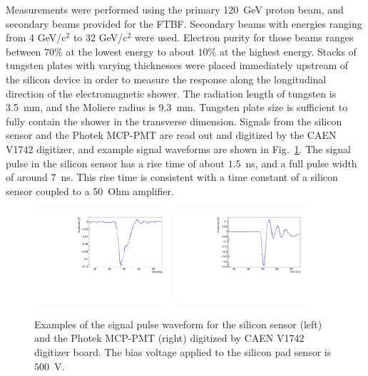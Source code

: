 \documentclass[12pt]{article}
\begin{document}
{Measurements were performed using the primary 120~GeV proton beam, and secondary
beams provided for the FTBF. Secondary beams with energies ranging from 4
GeV/c$^2$ to 32 GeV/c$^2$ were used. Electron purity for those beams ranges
between $70\%$ at the lowest energy to about $10\%$ at the highest energy.
Stacks of tungsten plates with varying thicknesses were placed immediately
upstream of the silicon device in order to measure the response along the
longitudinal direction of the electromagnetic shower. The radiation length of
tungsten is 3.5~mm, and the Moliere radius is 9.3~mm. Tungsten plate size is
sufficient to fully contain the shower in the transverse dimension. Signals from
the silicon sensor and the Photek MCP-PMT are read out and digitized by the CAEN
V1742 digitizer, and example signal waveforms are shown in
Fig.~\ref{fig:pulses}. The signal pulse in the silicon sensor has a rise time of
about $1.5$~ns, and a full pulse width of around $7$~ns. This rise time is
consistent with a time constant of a silicon sensor coupled to a 50~Ohm amplifier.

\begin{figure}[htbp] 
\centering
\includegraphics[width=0.45\textwidth]{plots/ExampleSiliconPadPulse_6X0_16GeV.pdf} 
\includegraphics[width=0.45\textwidth]{plots/ExamplePhotekPulse.pdf} 
\caption{Examples of the signal pulse waveform for the silicon sensor (left) and
the Photek MCP-PMT (right) digitized by CAEN V1742 digitizer board. The bias
voltage applied to the silicon pad sensor is~$500$~V.} 
\label{fig:pulses} 
\end{figure} 

}
\end{document}
